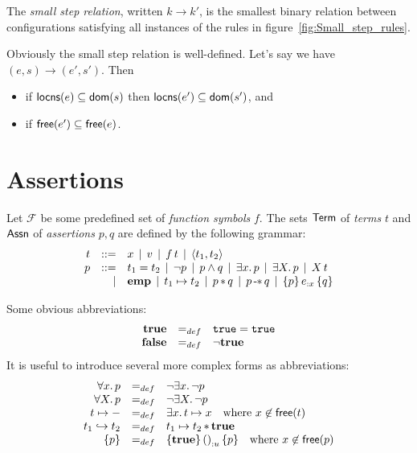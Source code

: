 \documentclass[12pt,a4paper]{article}
\newcommand{\Conf}{\sstyle{Conf}}
\newcommand{\emp}{\ensuremath{\mathbf{emp}}}
\begin{document}
\begin{definition}
  The {\em small step relation}, written $k \to k'$, is the smallest binary relation between configurations
  satisfying all instances of the rules in figure~\ref{fig:Small_step_rules}.
\end{definition}

Obviously the small step relation is well-defined. Let's say we have $(e,s)\to(e',s')$. Then
\begin{itemize}
\item if $\mathsf{locns}(e) \subseteq \mathsf{dom}(s)$ then $\mathsf{locns}(e') \subseteq \mathsf{dom}(s')$, and
\item if $\mathsf{free}(e') \subseteq \mathsf{free}(e)$.
\end{itemize}


\section{Assertions}

\begin{definition}[Assertions]
  Let $\mathcal{F}$ be some predefined set of {\em function symbols} $f$.
  The sets $\mathsf{Term}$ of {\em terms} $t$ and $\mathsf{Assn}$ of {\em assertions} $p,q$ are defined by the following grammar:
  \[\GRbeg
  t \GRis x \GRmid v \GRmid \app{f}{t} \GRmid \pair{t_1}{t_2}
  \\
  p \GRis t_1 = t_2 \GRmid \neg p \GRmid p \wedge q \GRmid \exists x.\,p \GRmid \exists X.\,p \GRmid \app{X}{t}
  \GRal \emp \GRmid t_1 \mapsto t_2 \GRmid p \sepcon q \GRmid p \sepimp q  \GRmid \triplex{p}{e}{x}{q}
  \GRend\]
\end{definition}

Some obvious abbreviations:
\[\begin{array}{rcl}
  \mathbf{true} &=_{def}& \mathtt{true} = \mathtt{true} \\
  \mathbf{false} &=_{def}& \neg \mathbf{true}
\end{array}\]
It is useful to introduce several more complex forms as abbreviations:
\[\begin{array}{rcl}
  \forall x.\,p &=_{def}& \neg \exists x.\,\neg p \\
  \forall X.\,p &=_{def}& \neg \exists X.\,\neg p \\
  t \mapsto - &=_{def}& \exists x.\,t \mapsto x \quad \text{where $x\not\in\mathsf{free}(t)$} \\
  t_1 \hookrightarrow t_2 &=_{def}& t_1 \mapsto t_2 \operatorname{\ast} \mathbf{true} \\
  \{p\} &=_{def}& \{\mathbf{true}\}\,{\mathtt{()}}_{:{u}}\,\{p\} \quad \text{where $x\not\in\mathsf{free}(p)$}
\end{array}\]
\end{document}

